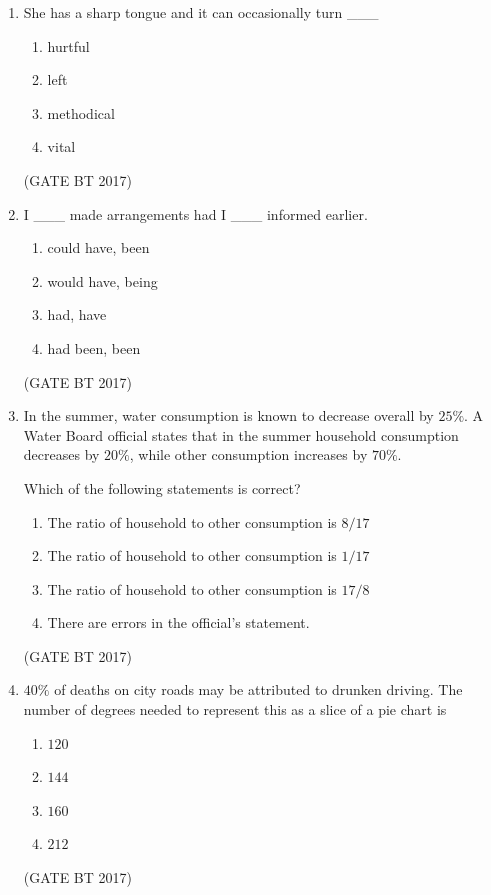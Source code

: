 \documentclass[journal,12pt,onecolumn]{IEEEtran}
\theoremstyle{remark}
\begin{document}
\begin{enumerate}
\item She has a sharp tongue and it can occasionally turn \_\_\_

\begin{enumerate}
  \item hurtful
  \item left
  \item methodical
  \item vital
\end{enumerate}
\hfill (GATE BT 2017)

\item I \_\_\_ made arrangements had I \_\_\_ informed earlier.

\begin{enumerate}
  \item could have, been
  \item would have, being
  \item had, have
  \item had been, been
\end{enumerate}
\hfill (GATE BT 2017)

\item In the summer, water consumption is known to decrease overall by $25\%$. A Water Board official states that in the summer household consumption decreases by $20\%$, while other consumption increases by $70\%$. 

Which of the following statements is correct?

\begin{enumerate}
  \item The ratio of household to other consumption is $8/17$
  \item The ratio of household to other consumption is $1/17$
  \item The ratio of household to other consumption is $17/8$
  \item There are errors in the official's statement.
\end{enumerate}
\hfill (GATE BT 2017)

\item $40\%$ of deaths on city roads may be attributed to drunken driving. The number of degrees needed to represent this as a slice of a pie chart is

\begin{enumerate}
  \item $120$
  \item $144$
  \item $160$
  \item $212$
\end{enumerate}
\hfill (GATE BT 2017)


\end{enumerate}
\end{document}
